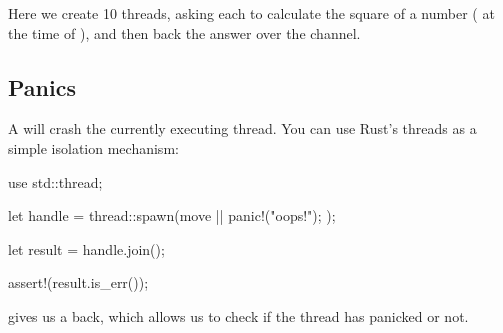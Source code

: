 Here we create 10 threads, asking each to calculate the square of a number ( at the time of ), and then  
back the answer over the channel.

\subsection*{Panics}

A  will crash the currently executing thread. You can use Rust's threads as a simple isolation mechanism:

\begin{rustc}
use std::thread;

let handle = thread::spawn(move || {
    panic!("oops!");
});

let result = handle.join();

assert!(result.is_err());

\end{rustc}

 gives us a  back, which allows us to check if the thread has panicked or not.
